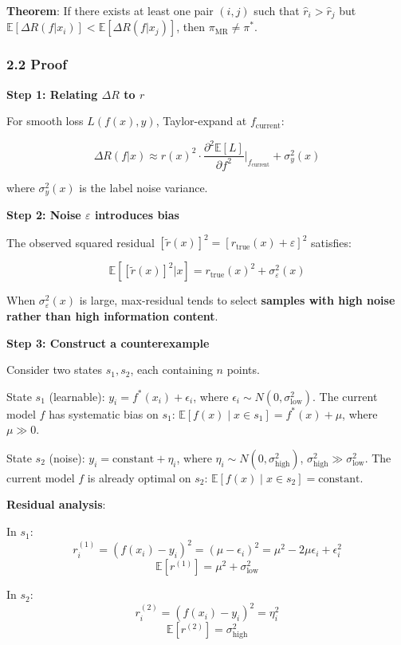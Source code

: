 \documentclass[
  12pt,
]{article}
\begin{document}
\textbf{Theorem}: If there exists at least one pair \((i,j)\) such that
\(\hat{r}_i > \hat{r}_j\) but
\(\mathbb{E}[\Delta R(f|x_i)] < \mathbb{E}[\Delta R(f|x_j)]\), then
\(\pi_{\text{MR}} \neq \pi^*\).

\subsubsection{2.2 Proof}\label{proof}

\textbf{Step 1: Relating \(\Delta R\) to \(r\)}

For smooth loss \(L(f(x), y)\), Taylor-expand at \(f_{\text{current}}\):

\[\Delta R(f|x) \approx r(x)^2 \cdot \frac{\partial^2 \mathbb{E}[L]}{\partial f^2}\bigg|_{f_{\text{current}}} + \sigma_y^2(x)\]

where \(\sigma_y^2(x)\) is the label noise variance.

\textbf{Step 2: Noise \(\varepsilon\) introduces bias}

The observed squared residual
\([\tilde{r}(x)]^2 = [r_{\text{true}}(x) + \varepsilon]^2\) satisfies:

\[\mathbb{E}[[\tilde{r}(x)]^2 | x] = r_{\text{true}}(x)^2 + \sigma_\varepsilon^2(x)\]

When \(\sigma_\varepsilon^2(x)\) is large, max-residual
tends to select \textbf{samples with high noise rather than high information content}.

\textbf{Step 3: Construct a counterexample}

Consider two states \(s_1, s_2\), each containing \(n\) points.

State \(s_1\) (learnable): \(y_i = f^*(x_i) + \epsilon_i\), where
\(\epsilon_i \sim N(0, \sigma^2_{\text{low}})\). The current model \(f\) has
systematic bias on \(s_1\):
\(\mathbb{E}[f(x) \mid x \in s_1] = f^*(x) + \mu\), where
\(\mu \gg 0\).

State \(s_2\) (noise): \(y_i = \text{constant} + \eta_i\), where
\(\eta_i \sim N(0, \sigma^2_{\text{high}})\), \(\sigma^2_{\text{high}} \gg \sigma^2_{\text{low}}\).
The current model \(f\) is already optimal on \(s_2\):
\(\mathbb{E}[f(x) \mid x \in s_2] = \text{constant}\).

\textbf{Residual analysis}:

In \(s_1\):
\[r_i^{(1)} = (f(x_i) - y_i)^2 = (\mu - \epsilon_i)^2 = \mu^2 - 2\mu\epsilon_i + \epsilon_i^2\]
\[\mathbb{E}[r^{(1)}] = \mu^2 + \sigma^2_{\text{low}}\]

In \(s_2\):
\[r_i^{(2)} = (f(x_i) - y_i)^2 = \eta_i^2\]
\[\mathbb{E}[r^{(2)}] = \sigma^2_{\text{high}}\]
\end{document}
